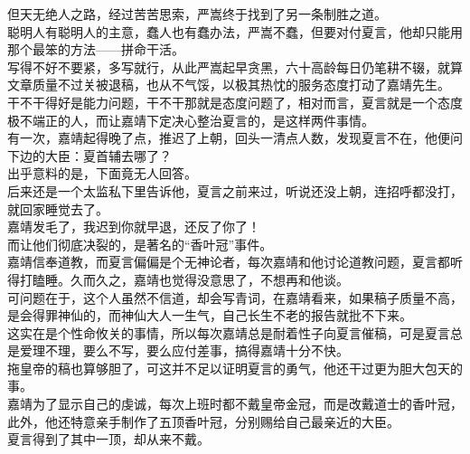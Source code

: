 \begin{multicols}{\theparacolNo}
但天无绝人之路，经过苦苦思索，严嵩终于找到了另一条制胜之道。\\

聪明人有聪明人的主意，蠢人也有蠢办法，严嵩不蠢，但要对付夏言，他却只能用那个最笨的方法——拼命干活。\\

写得不好不要紧，多写就行，从此严嵩起早贪黑，六十高龄每日仍笔耕不辍，就算文章质量不过关被退稿，也从不气馁，以极其热忱的服务态度打动了嘉靖先生。\\

干不干得好是能力问题，干不干那就是态度问题了，相对而言，夏言就是一个态度极不端正的人，而让嘉靖下定决心整治夏言的，是这样两件事情。\\

有一次，嘉靖起得晚了点，推迟了上朝，回头一清点人数，发现夏言不在，他便问下边的大臣：夏首辅去哪了？\\

出乎意料的是，下面竟无人回答。\\

后来还是一个太监私下里告诉他，夏言之前来过，听说还没上朝，连招呼都没打，就回家睡觉去了。\\

嘉靖发毛了，我迟到你就早退，还反了你了！\\

而让他们彻底决裂的，是著名的“香叶冠”事件。\\

嘉靖信奉道教，而夏言偏偏是个无神论者，每次嘉靖和他讨论道教问题，夏言都听得打瞌睡。久而久之，嘉靖也觉得没意思了，不想再和他谈。\\

可问题在于，这个人虽然不信道，却会写青词，在嘉靖看来，如果稿子质量不高，是会得罪神仙的，而神仙大人一生气，自己长生不老的报告就批不下来。\\

这实在是个性命攸关的事情，所以每次嘉靖总是耐着性子向夏言催稿，可是夏言总是爱理不理，要么不写，要么应付差事，搞得嘉靖十分不快。\\

拖皇帝的稿也算够胆了，可这并不足以证明夏言的勇气，他还干过更为胆大包天的事。\\

嘉靖为了显示自己的虔诚，每次上班时都不戴皇帝金冠，而是改戴道士的香叶冠，此外，他还特意亲手制作了五顶香叶冠，分别赐给自己最亲近的大臣。\\

夏言得到了其中一顶，却从来不戴。\\


\end{multicols}
